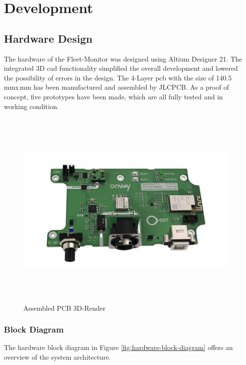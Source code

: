 \chapter{Development}

\section{Hardware Design}
The hardware of the Fleet-Monitor was designed using Altium Designer 21. The integrated 3D \acrshort{cad} functionality simplified the overall development and lowered the possibility of errors in the design. The 4-Layer \acrfull{pcb} with the size of 140.5\,mm\;x\,mm has been manufactured and assembled by JLCPCB.\newline
As a proof of concept, five prototypes have been made, which are all fully tested and in working condition.

\begin{figure}[h!]
	\hfuzz=57.0pt
	\hspace{-1.4cm}
	\includegraphics[height=10.0cm]{images/fleet-monitor-rendering-pcb}
	\caption{Assembled PCB 3D-Render}
	\label{fig:fleet-monitor-rendering-pcb}
\end{figure}
\newpage

\subsection{Block Diagram}
The hardware block diagram in Figure \ref{fig:hardware-block-diagram} offers an overview of the system architecture.

